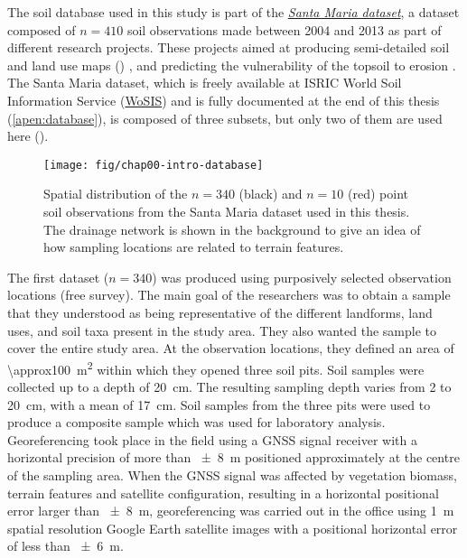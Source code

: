 The soil database used in this study is part of the 
\hyperref[apen:database]{\textit{Santa Maria dataset}}, a dataset composed of $n = 410$ soil 
observations made between \num{2004} and \num{2013} as part of different research
projects. These projects aimed at producing semi-detailed soil and land use maps () 
\citep{Pedron2005, Miguel2010, SamuelRosaEtAl2011a, MiguelEtAl2012, Samuel-RosaEtAl2013}, and 
predicting the vulnerability of the topsoil to erosion \citep{MouraBueno2012, Miguel2013}. 
The Santa Maria dataset, which is freely available at ISRIC World Soil Information Service 
(\href{http://www.isric.org/data/wosis}{WoSIS}) and is fully documented at the end of this thesis
(\autoref{apen:database}), is composed of three subsets, but only two of them are used here 
().


\begin{figure}[!ht]
\centering
\texttt{[image: fig/chap00-intro-database]}
\caption{Spatial distribution of the $n = 340$ (black) and $n = 10$ (red) point soil observations 
from the Santa Maria dataset used in this thesis. The drainage network is shown in the 
background to give an idea of how sampling locations are related to terrain features.}
\label{fig:intro-database}
\end{figure}

The first dataset ($n = 340$) was produced using purposively selected observation locations (free 
survey). The main goal of the researchers was to obtain a sample that they understood as being 
representative of the different landforms, land uses, and soil taxa present in the study area. They 
also wanted the sample to cover the entire study area. At the observation locations, they defined 
an area of \SI{\approx100}{\metre\squared} within which they opened three soil pits. Soil samples 
were collected up to a depth of \SI{20}{\centi\metre}. The resulting sampling depth varies from 
\num{2} to \SI{20}{\centi\metre}, with a mean of \SI{17}{\centi\metre}. Soil samples from the three 
pits were used to produce a composite sample which was used for laboratory analysis. Georeferencing 
took place in the field using a GNSS signal receiver with a horizontal precision of more than 
\SI{\pm8}{\metre} positioned approximately at the centre of the sampling area. When the GNSS signal 
was affected by vegetation biomass, terrain features and satellite configuration, resulting in a 
horizontal positional error larger than \SI{\pm8}{\metre}, georeferencing was carried out in the 
office using \SI{1}{\metre} spatial resolution Google Earth satellite images with a positional 
horizontal error of less than \SI{\pm6}{\metre}.

